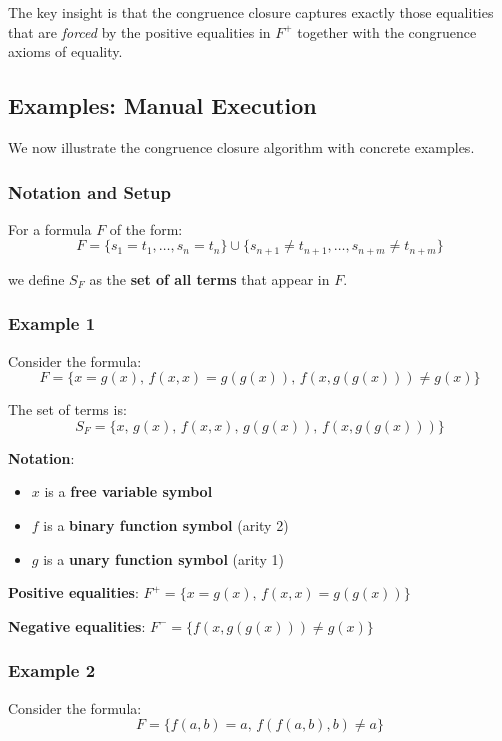 \documentclass[11pt,a4paper]{article}
\theoremstyle{definition}
\theoremstyle{plain}
\theoremstyle{remark}
\begin{document}
The key insight is that the congruence closure captures exactly those equalities that are \emph{forced} by the positive equalities in $F^+$ together with the congruence axioms of equality.

\subsection{Examples: Manual Execution}

We now illustrate the congruence closure algorithm with concrete examples.

\subsubsection{Notation and Setup}

For a formula $F$ of the form:
\[
F = \{s_1 = t_1, \dots, s_n = t_n\} \cup \{s_{n+1} \neq t_{n+1}, \dots, s_{n+m} \neq t_{n+m}\}
\]

we define $S_F$ as the \textbf{set of all terms} that appear in $F$.

\subsubsection{Example 1}

Consider the formula:
\[
F = \{x = g(x), \, f(x, x) = g(g(x)), \, f(x, g(g(x))) \neq g(x)\}
\]

The set of terms is:
\[
S_F = \{x, \, g(x), \, f(x, x), \, g(g(x)), \, f(x, g(g(x)))\}
\]

\textbf{Notation}:
\begin{itemize}
    \item $x$ is a \textbf{free variable symbol}
    \item $f$ is a \textbf{binary function symbol} (arity 2)
    \item $g$ is a \textbf{unary function symbol} (arity 1)
\end{itemize}

\textbf{Positive equalities}: $F^+ = \{x = g(x), \, f(x, x) = g(g(x))\}$

\textbf{Negative equalities}: $F^- = \{f(x, g(g(x))) \neq g(x)\}$

\subsubsection{Example 2}

Consider the formula:
\[
F = \{f(a, b) = a, \, f(f(a, b), b) \neq a\}
\]
\end{document}
